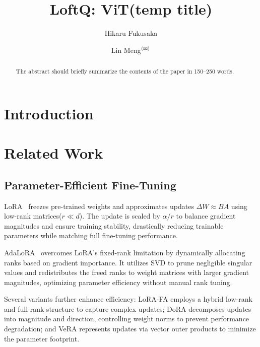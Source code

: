 \documentclass[runningheads]{llncs}
\begin{document}
%
\title{LoftQ: ViT(temp title)}
%
%
\author{Hikaru Fukusaka\and
Lin Meng$^{(\textrm{\Letter})}$}
%
%
%
\maketitle              %
%
\begin{abstract}
The abstract should briefly summarize the contents of the paper in
150--250 words.

\end{abstract}
%
%
%
\section{Introduction}

\section{Related Work}
\subsection{Parameter-Efficient Fine-Tuning}
\ac{LoRA}~\cite{hu2022lora} freezes pre-trained weights and approximates updates $\Delta W \approx BA$ using low-rank matrices($r \ll d$).
The update is scaled by $\alpha/r$ to balance gradient magnitudes and ensure training stability,
drastically reducing trainable parameters while matching full fine-tuning performance.

AdaLoRA~\cite{zhang2023adaptive} overcomes \ac{LoRA}'s fixed-rank limitation by dynamically allocating ranks based on gradient importance.
It utilizes \ac{SVD} to prune negligible singular values and redistributes the freed ranks to weight matrices with larger gradient magnitudes, optimizing parameter efficiency without manual rank tuning.

Several variants further enhance efficiency:
LoRA-FA employs a hybrid low-rank and full-rank structure to capture complex updates;
DoRA decomposes updates into magnitude and direction, controlling weight norms to prevent performance degradation;
and VeRA represents updates via vector outer products to minimize the parameter footprint.
\end{document}

